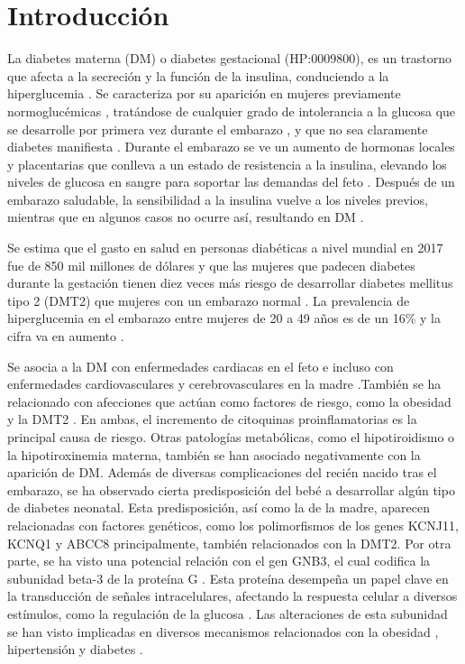 \section{Introducción}

La diabetes materna (DM) o diabetes gestacional (HP:0009800), es un trastorno que afecta a la secreción y la función de la insulina, conduciendo a la hiperglucemia \cite{Rodolaki2023}. Se caracteriza por su aparición en mujeres previamente normoglucémicas \cite{Rodolaki2023}, tratándose de cualquier grado de intolerancia a la glucosa que se desarrolle por primera vez durante el embarazo \cite{ADB2009}, y que no sea claramente diabetes manifiesta \cite{Grazia2020}. Durante el embarazo se ve un aumento de hormonas locales y placentarias que conlleva a un estado de resistencia a la insulina, elevando los niveles de glucosa en sangre para soportar las demandas del feto \cite{Plows2018}. Después de un embarazo saludable, la sensibilidad a la insulina vuelve a los niveles previos, mientras que en algunos casos no ocurre así, resultando en DM \cite{Plows2018}.


Se estima que el gasto en salud en personas diabéticas a nivel mundial en 2017 fue de 850 mil millones de dólares \cite{Cho2018} y que las mujeres que padecen diabetes durante la gestación tienen diez veces más riesgo de desarrollar diabetes mellitus tipo 2 (DMT2) que mujeres con un embarazo normal \cite{Vounzoulaki2020} \cite{You2021}. La prevalencia de hiperglucemia en el embarazo entre mujeres de 20 a 49 años es de un 16\% y la cifra va en aumento \cite{Guariguata2014}.

Se asocia a la DM con enfermedades cardiacas en el feto \cite{Depla2021} e incluso con enfermedades cardiovasculares y cerebrovasculares en la madre \cite{Xie2022}.También se ha relacionado con afecciones que actúan como factores de riesgo, como la obesidad\cite{Shah2011} y la DMT2 \cite{Haroush2004}. En ambas, el incremento de citoquinas proinflamatorias es la principal causa de riesgo\cite{Pantham2015}. Otras patologías metabólicas, como el hipotiroidismo\cite{Gong2016} o la hipotiroxinemia materna\cite{Topaloglu2022}, también se han asociado negativamente con la aparición de DM.
Además de diversas complicaciones del recién nacido tras el embarazo\cite{Depla2021}\cite{Metzger2010}, se ha observado cierta predisposición del bebé a desarrollar algún tipo de diabetes neonatal\cite{Dabelea2000}. Esta predisposición, así como la de la madre, aparecen relacionadas con factores genéticos, como los polimorfismos de los genes KCNJ11, KCNQ1\cite{Ao2015} y ABCC8 \cite{Piccini2018} principalmente, también relacionados con la DMT2\cite{Khan2020}.
Por otra parte, se ha visto una potencial relación con el gen GNB3, el cual codifica la subunidad beta-3 de la proteína G \cite{Feng2019}. Esta proteína desempeña un papel clave en la transducción de señales intracelulares, afectando la respuesta celular a diversos estímulos, como la regulación de la glucosa \cite{Neves2002}. Las alteraciones de esta subunidad se han visto implicadas en diversos mecanismos relacionados con la obesidad \cite{Hsiao2013}, hipertensión y diabetes \cite{Siffert2005}.
 
